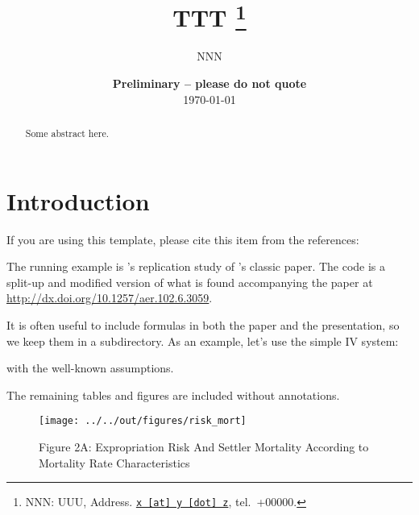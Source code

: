 \documentclass[11pt, a4paper, leqno]{article}
\begin{document}
\title{TTT
\thanks{NNN: UUU, Address. \href{mailto:x@y.z} {\nolinkurl{x [at] y [dot] z}}, tel.~+00000.}
}

\author{NNN
}

\date{
{\bf Preliminary -- please do not quote} 
\\[1ex] 
\today
}

\maketitle


\begin{abstract}
	Some abstract here.
\end{abstract}
\clearpage

\section{Introduction} %
\label{sec:introduction}

If you are using this template, please cite this item from the references: \citet{GaudeckerEconProjectTemplates}

The running example is \citeauthor{Albouy12}'s \citeyear{Albouy12} replication study of \citeauthor{AcemogluJohnsonRobinson01}'s classic \citeyear{AcemogluJohnsonRobinson01} paper. The code is a split-up and modified version of what is found accompanying the paper at \url{http://dx.doi.org/10.1257/aer.102.6.3059}.

It is often useful to include formulas in both the paper and the presentation, so we keep them in a subdirectory. As an example, let's use the simple IV system:

with the well-known assumptions.

The remaining tables and figures are included without annotations.\\[4ex]






\begin{figure} 
    \centering   
    \texttt{[image: ../../out/figures/risk\_mort]}
    \caption*{Figure 2A: Expropriation Risk And Settler Mortality According to Mortality Rate Characteristics}
\end{figure}
\end{document}
